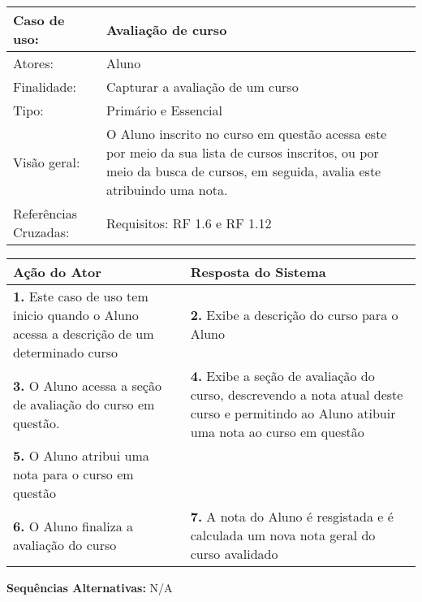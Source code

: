 \documentclass[12pt,a4paper,onecolumn,titlepage]{article}
\begin{document}
\begin{table}[h!]
\begin{center}
\begin{tabular}{p{2.5cm} p{9.5cm}}
Caso de uso: & \textbf{Avaliação de curso} \\ \hline
Atores: & Aluno \\ \hline
Finalidade: & Capturar a avaliação de um curso\\ \hline
Tipo: & Primário e Essencial \\ \hline
Visão geral: & O Aluno inscrito no curso em questão acessa este por meio da sua lista de cursos inscritos, ou por meio da busca de cursos, em seguida, avalia este atribuindo uma nota. \\ \hline
Referências Cruzadas: & Requisitos: RF 1.6 e RF 1.12\\

\end{tabular}
\end{center}
\end{table} 

\begin{center}
\def\arraystretch{1.1}
\begin{tabular}{|p{6cm}|p{6cm}|}

\hline
\textbf{Ação do Ator} & \textbf{Resposta do Sistema} \\ \hline
\textbf{1.} Este caso de uso tem inicio quando o Aluno acessa a descrição de um determinado curso  & \textbf{2.} Exibe a descrição do curso para o Aluno  \\ \hline
\textbf{3.} O Aluno acessa a seção de avaliação do curso em questão.  & \textbf{4.} Exibe a seção de avaliação do curso, descrevendo a nota atual deste curso e permitindo ao Aluno atibuir uma nota ao curso em questão  \\ \hline
\textbf{5.} O Aluno atribui uma nota para o curso em questão  &   \\ \hline
\textbf{6.} O Aluno finaliza a avaliação do curso  & \textbf{7.} A nota do Aluno é resgistada e é calculada um nova nota geral do curso avalidado \\ \hline
\end{tabular}
\end{center}

\textbf{Sequências Alternativas:} N/A


\newpage
\end{document}
